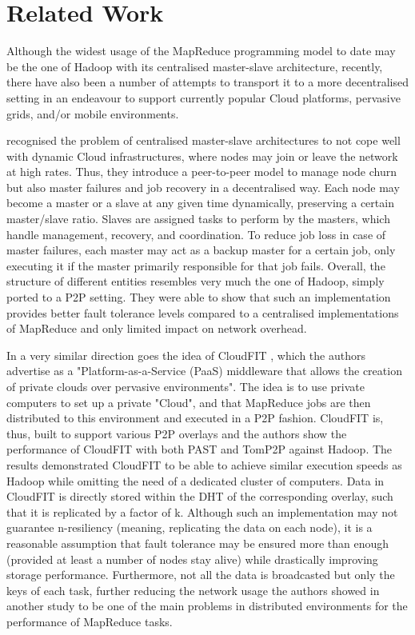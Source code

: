 \chapter{Related Work}
Although the widest usage of the MapReduce programming model to date may be the one of Hadoop \cite{Hadoop} with its centralised master-slave architecture, recently, there have also been a number of attempts to transport it to a more decentralised setting in an endeavour to support currently popular Cloud platforms, pervasive grids, and/or mobile environments. 

\cite{Marozzo2012a} recognised the problem of centralised master-slave architectures to not cope well with dynamic Cloud infrastructures, where nodes may join or leave the network at high rates. Thus, they introduce a peer-to-peer model to manage node churn but also master failures and job recovery in a decentralised way. Each node may become a master or a slave at any given time dynamically, preserving a certain master/slave ratio. Slaves are assigned tasks to perform by the masters, which handle management, recovery, and coordination. To reduce job loss in case of master failures, each master may act as a backup master for a certain job, only executing it if the master primarily responsible for that job fails. Overall, the structure of different entities resembles very much the one of Hadoop, simply ported to a P2P setting. They were able to show that such an implementation provides better fault tolerance levels compared to a centralised implementations of MapReduce and only limited impact on network overhead. 

In a very similar direction goes the idea of CloudFIT \cite{Steffenel2015}, which the authors advertise as a "Platform-as-a-Service (PaaS) middleware that allows the creation of private clouds over pervasive environments". The idea is to use private computers to set up a private "Cloud", and that MapReduce jobs are then distributed to this environment and executed in a P2P fashion. CloudFIT is, thus, built to support various P2P overlays and the authors show the performance of CloudFIT with both PAST and TomP2P against Hadoop. The results demonstrated CloudFIT to be able to achieve similar execution speeds as Hadoop while omitting the need of a dedicated cluster of computers. Data in CloudFIT is directly stored within the DHT of the corresponding overlay, such that it is replicated by a factor of k. Although such an implementation may not guarantee n-resiliency (meaning, replicating the data on each node), it is a reasonable assumption that fault tolerance may be ensured more than enough (provided at least a number of nodes stay alive) while drastically improving storage performance. Furthermore, not all the data is broadcasted but only the keys of each task, further reducing the network usage the authors showed in another study \cite{Steffenel2015a} to be one of the main problems in distributed environments for the performance of MapReduce tasks.

